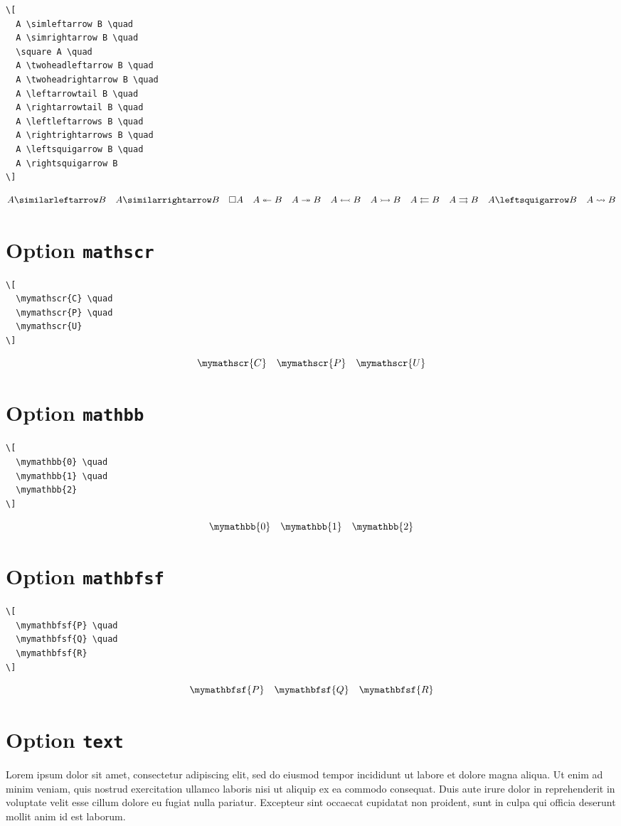 \documentclass{article}
\begin{document}
\begin{verbatim}
\[
  A \simleftarrow B \quad
  A \simrightarrow B \quad
  \square A \quad
  A \twoheadleftarrow B \quad
  A \twoheadrightarrow B \quad
  A \leftarrowtail B \quad
  A \rightarrowtail B \quad
  A \leftleftarrows B \quad
  A \rightrightarrows B \quad
  A \leftsquigarrow B \quad
  A \rightsquigarrow B
\]
\end{verbatim}
%
\[
  A \simleftarrow B \quad
  A \simrightarrow B \quad
  \square A \quad
  A \twoheadleftarrow B \quad
  A \twoheadrightarrow B \quad
  A \leftarrowtail B \quad
  A \rightarrowtail B \quad
  A \leftleftarrows B \quad
  A \rightrightarrows B \quad
  A \leftsquigarrow B \quad
  A \rightsquigarrow B
\]

\section{Option \texttt{mathscr}}

\begin{verbatim}
\[
  \mymathscr{C} \quad
  \mymathscr{P} \quad
  \mymathscr{U}
\]
\end{verbatim}
%
\[
  \mymathscr{C} \quad
  \mymathscr{P} \quad
  \mymathscr{U}
\]

\section{Option \texttt{mathbb}}

\begin{verbatim}
\[
  \mymathbb{0} \quad
  \mymathbb{1} \quad
  \mymathbb{2}
\]
\end{verbatim}
%
\[
  \mymathbb{0} \quad
  \mymathbb{1} \quad
  \mymathbb{2}
\]

\section{Option \texttt{mathbfsf}}

\begin{verbatim}
\[
  \mymathbfsf{P} \quad
  \mymathbfsf{Q} \quad
  \mymathbfsf{R}
\]
\end{verbatim}
%
\[
  \mymathbfsf{P} \quad
  \mymathbfsf{Q} \quad
  \mymathbfsf{R}
\]

\section{Option \texttt{text}}

Lorem ipsum dolor sit amet, consectetur adipiscing elit, sed do
eiusmod tempor incididunt ut labore et dolore magna aliqua. Ut enim ad
minim veniam, quis nostrud exercitation ullamco laboris nisi ut
aliquip ex ea commodo consequat. Duis aute irure dolor in
reprehenderit in voluptate velit esse cillum dolore eu fugiat nulla
pariatur. Excepteur sint occaecat cupidatat non proident, sunt in
culpa qui officia deserunt mollit anim id est laborum.
\end{document}
